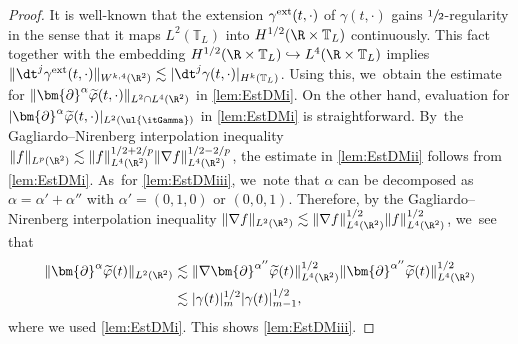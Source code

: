\begin{proof}
It is well-known that the extension $\gamma^{\rm ext}(t,\cdot)$ of $\gamma(t,\cdot)$ gains $\sfrac12$-regularity in the sense that
it maps $L^2(\mathbb{T}_L)$ into $H^{1/2}(\R\times\mathbb{T}_L)$ continuously.
This fact together with the embedding $H^{1/2}(\R\times\mathbb{T}_L) \hookrightarrow L^4(\R\times\mathbb{T}_L)$ implies
$\|\dt^j\gamma^{\rm ext}(t,\cdot)\|_{W^{k,4}(\R^2)} \lesssim |\dt^j\gamma(t,\cdot)|_{H^k(\mathbb{T}_L)}$.
Using this, we~obtain the estimate for $\|\bm{\partial}^\alpha\widetilde{\varphi}(t,\cdot)\|_{L^2\cap L^4(\R^2)}$ in \eqref{lem:EstDMi}.
On the other hand, evaluation for $|\bm{\partial}^\alpha\widetilde{\varphi}(t,\cdot)|_{L^2(\ul{\itGamma})}$ in \eqref{lem:EstDMi} is straightforward. By~the Gagliardo--Nirenberg interpolation inequality $\|f\|_{L^p(\R^2)}\lesssim \|f\|_{L^4(\R^2)}^{1/2+2/p}\|\nabla f\|_{L^4(\R^2)}^{1/2-2/p}$,
the estimate in \eqref{lem:EstDMii} follows from \eqref{lem:EstDMi}. As~for \eqref{lem:EstDMiii}, we~note that $\alpha$ can be decomposed as $\alpha=\alpha'+\alpha''$ with $\alpha'=(0,1,0)$ or $(0,0,1)$.
Therefore, by the Gagliardo--Nirenberg interpolation inequality $\|\nabla f\|_{L^2(\R^2)} \lesssim \|\nabla f\|_{L^4(\R^2)}^{1/2} \|f\|_{L^4(\R^2)}^{1/2}$, we~see that
\begin{align*}
\|\bm{\partial}^\alpha\widetilde{\varphi}(t)\|_{L^2(\R^2)}
&\lesssim \|\nabla\bm{\partial}^{\alpha''}\widetilde{\varphi}(t)\|_{L^4(\R^2)}^{1/2} \|\bm{\partial}^{\alpha''}\widetilde{\varphi}(t)\|_{L^4(\R^2)}^{1/2} \\
&\lesssim |\gamma(t)|_m^{1/2} |\gamma(t)|_{m-1}^{1/2},
\end{align*}
where we used \eqref{lem:EstDMi}.
This shows \eqref{lem:EstDMiii}.
\end{proof}

